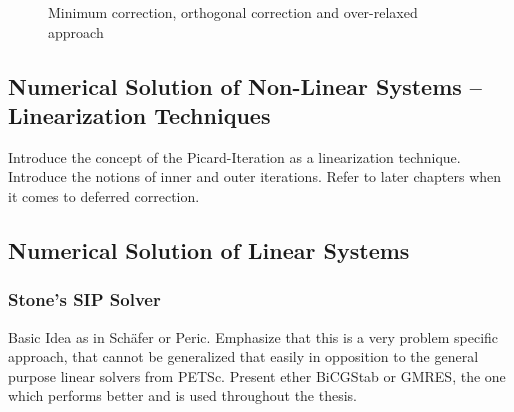       \begin{figure}[h]
      \label{fig:nonorth}
      \qquad
      \caption{Minimum correction, orthogonal correction and over-relaxed approach}
      \end{figure}

    \subsection{Numerical Solution of Non-Linear Systems -- Linearization Techniques}

      Introduce the concept of the Picard-Iteration as a linearization technique. Introduce the notions of inner and outer iterations. Refer to later chapters when it comes to deferred correction.

    \subsection{Numerical Solution of Linear Systems}

        

       \subsubsection{Stone's SIP Solver}

         Basic Idea as in Schäfer or Peric. Emphasize that this is a very problem specific approach, that cannot be generalized that easily in opposition to the general purpose linear solvers from PETSc. Present ether BiCGStab or GMRES, the one which performs better and is used throughout the thesis.

